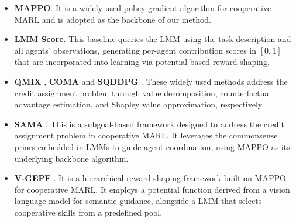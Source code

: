 \documentclass[11pt]{article}
\begin{document}
\begin{itemize}[label=\textendash, noitemsep, topsep=0pt, leftmargin=*]
    \item \textbf{MAPPO}. It is a widely used policy-gradient algorithm for cooperative MARL and is adopted as the backbone of our method.
  \item \textbf{LMM Score}. This baseline queries the LMM using the task description and all agents’ observations, generating per-agent contribution scores in $[0,1]$ that are incorporated into learning via potential-based reward shaping.
  \item \textbf{QMIX} \cite{rashid2020monotonic}, \textbf{COMA} \cite{foerster2017counterfactual} and \textbf{SQDDPG} \cite{wang2020shapley}. These widely used methods address the credit assignment problem through value decomposition, counterfactual advantage estimation, and Shapley value approximation, respectively.
  \item \textbf{SAMA} \cite{li2025multi}. This is a subgoal-based framework designed to address the credit assignment problem in cooperative MARL. It leverages the commonsense priors embedded in LMMs to guide agent coordination, using MAPPO as its underlying backbone algorithm.
  \item \textbf{V-GEPF} \cite{ma2025vision}. It is a hierarchical reward-shaping framework built on MAPPO for cooperative MARL. It employs a potential function derived from a vision language model for semantic guidance, alongside a LMM that selects cooperative skills from a predefined pool.
\end{itemize}

%

%
\end{document}
